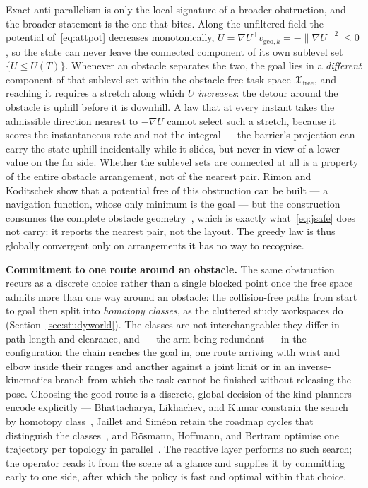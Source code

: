 \documentclass[12pt,a4paper,twoside,openright]{report}
\begin{document}
Exact anti-parallelism is only the local signature of a broader obstruction, and the broader statement is the one that bites. Along the unfiltered field the potential of~\eqref{eq:attpot} decreases monotonically, $\dot{U} = \nabla U^{\top}v_{\text{geo},k} = -\lVert\nabla U\rVert^{2} \le 0$, so the state can never leave the connected component of its own sublevel set $\{U \le U(T)\}$. Whenever an obstacle separates the two, the goal lies in a \emph{different} component of that sublevel set within the obstacle-free task space $\mathcal{X}_{\text{free}}$, and reaching it requires a stretch along which $U$ \emph{increases}: the detour around the obstacle is uphill before it is downhill. A law that at every instant takes the admissible direction nearest to $-\nabla U$ cannot select such a stretch, because it scores the instantaneous rate and not the integral --- the barrier's projection can carry the state uphill incidentally while it slides, but never in view of a lower value on the far side. Whether the sublevel sets are connected at all is a property of the entire obstacle arrangement, not of the nearest pair. Rimon and Koditschek show that a potential free of this obstruction can be built --- a navigation function, whose only minimum is the goal --- but the construction consumes the complete obstacle geometry~\cite{rimon1992exact}, which is exactly what~\eqref{eq:jsafe} does not carry: it reports the nearest pair, not the layout. The greedy law is thus globally convergent only on arrangements it has no way to recognise.

\textbf{Commitment to one route around an obstacle.} The same obstruction recurs as a discrete choice rather than a single blocked point once the free space admits more than one way around an obstacle: the collision-free paths from start to goal then split into \emph{homotopy classes}, as the cluttered study workspaces do (Section~\ref{sec:studyworld}). The classes are not interchangeable: they differ in path length and clearance, and --- the arm being redundant --- in the configuration the chain reaches the goal in, one route arriving with wrist and elbow inside their ranges and another against a joint limit or in an inverse-kinematics branch from which the task cannot be finished without releasing the pose. Choosing the good route is a discrete, global decision of the kind planners encode explicitly --- Bhattacharya, Likhachev, and Kumar constrain the search by homotopy class~\cite{bhattacharya2012topological}, Jaillet and Sim\'eon retain the roadmap cycles that distinguish the classes~\cite{jaillet2008deformation}, and R\"osmann, Hoffmann, and Bertram optimise one trajectory per topology in parallel~\cite{rosmann2017topologies}. The reactive layer performs no such search; the operator reads it from the scene at a glance and supplies it by committing early to one side, after which the policy is fast and optimal within that choice.
\end{document}
